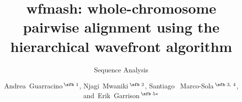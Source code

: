 \documentclass{bioinfo}
\begin{document}

\subtitle{Sequence Analysis}

\title[wfmash: whole-cromosome pairwise aligner]{wfmash: whole-chromosome pairwise alignment using the hierarchical wavefront algorithm}
\author[Guarracino \textit{et~al}.]{
Andrea~Guarracino\,$^{\text{\sfb 1}}$,
Njagi~Mwaniki\,$^{\text{\sfb 2}}$,
Santiago~ Marco-Sola\,$^{\text{\sfb 3, 4}}$,
and~Erik~Garrison\,$^{\text{\sfb 5}*}$
}

\address{
$^{\text{\sf 1}}$Genomics Research Centre, Human Technopole, Milan, Italy \\
$^{\text{\sf 2}}$???, ???, Pisa, Italy \\
$^{\text{\sf 3}}$Department of Computer Sciences, Barcelona Supercomputing Center, Barcelona 08034, Spain \\
$^{\text{\sf 4}}$Departament d’Arquitectura de Computadors i Sistemes Operatius, Universitat Autònoma de Barcelona, Barcelona 08193, Spain \\
$^{\text{\sf 5}}$University of Tennessee Health Science Center, Memphis, TN, USA
}





\end{document}
